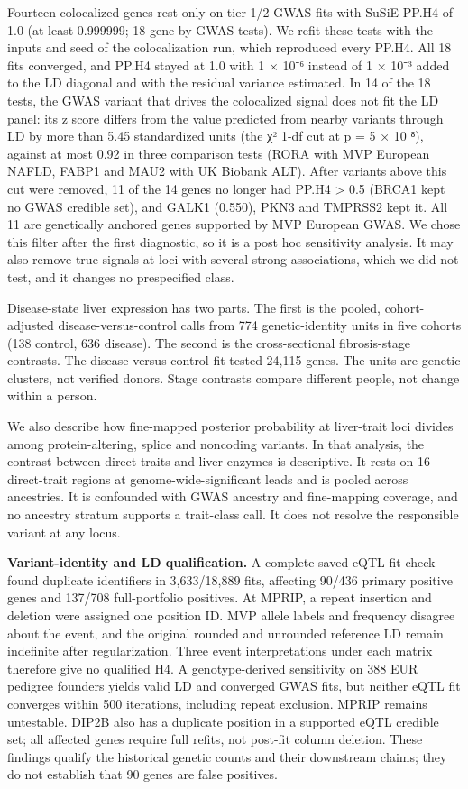 Fourteen colocalized genes rest only on tier-1/2 GWAS fits with SuSiE PP.H4 of 1.0 (at least 0.999999; 18 gene-by-GWAS tests). We refit these tests with the inputs and seed of the colocalization run, which reproduced every PP.H4. All 18 fits converged, and PP.H4 stayed at 1.0 with 1 × 10⁻⁶ instead of 1 × 10⁻³ added to the LD diagonal and with the residual variance estimated. In 14 of the 18 tests, the GWAS variant that drives the colocalized signal does not fit the LD panel: its z score differs from the value predicted from nearby variants through LD by more than 5.45 standardized units (the χ² 1-df cut at p = 5 × 10⁻⁸), against at most 0.92 in three comparison tests (RORA with MVP European NAFLD, FABP1 and MAU2 with UK Biobank ALT). After variants above this cut were removed, 11 of the 14 genes no longer had PP.H4 \textgreater{} 0.5 (BRCA1 kept no GWAS credible set), and GALK1 (0.550), PKN3 and TMPRSS2 kept it. All 11 are genetically anchored genes supported by MVP European GWAS. We chose this filter after the first diagnostic, so it is a post hoc sensitivity analysis. It may also remove true signals at loci with several strong associations, which we did not test, and it changes no prespecified class.

Disease-state liver expression has two parts. The first is the pooled, cohort-adjusted disease-versus-control calls from 774 genetic-identity units in five cohorts (138 control, 636 disease). The second is the cross-sectional fibrosis-stage contrasts. The disease-versus-control fit tested 24,115 genes. The units are genetic clusters, not verified donors. Stage contrasts compare different people, not change within a person.

We also describe how fine-mapped posterior probability at liver-trait loci divides among protein-altering, splice and noncoding variants. In that analysis, the contrast between direct traits and liver enzymes is descriptive. It rests on 16 direct-trait regions at genome-wide-significant leads and is pooled across ancestries. It is confounded with GWAS ancestry and fine-mapping coverage, and no ancestry stratum supports a trait-class call. It does not resolve the responsible variant at any locus.

\textbf{Variant-identity and LD qualification.} A complete saved-eQTL-fit check found
duplicate identifiers in 3,633/18,889 fits, affecting 90/436 primary positive
genes and 137/708 full-portfolio positives. At MPRIP, a repeat insertion and
deletion were assigned one position ID. MVP allele labels and frequency disagree
about the event, and the original rounded and unrounded reference LD remain
indefinite after regularization. Three event interpretations under each matrix
therefore give no qualified H4. A genotype-derived sensitivity on 388 EUR
pedigree founders yields valid LD and converged GWAS fits, but neither eQTL fit
converges within 500 iterations, including repeat exclusion. MPRIP remains
untestable. DIP2B also has a duplicate position in a supported eQTL credible set;
all affected genes require full refits, not post-fit column deletion. These
findings qualify the historical genetic counts and their downstream claims;
they do not establish that 90 genes are false positives.

